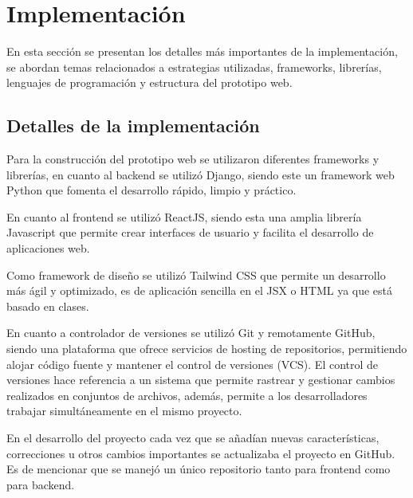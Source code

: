 \documentclass[../Main.tex]{subfiles}
\begin{document}
    \section{Implementación}
    \begin{justify}
    En esta sección se presentan los detalles más importantes de la implementación, se abordan temas relacionados a estrategias utilizadas, frameworks, librerías, lenguajes de programación y estructura del prototipo web.
    
    \end{justify}
    
    \subsection{Detalles de la implementación}
    \begin{justify}
    Para la construcción del prototipo web se utilizaron diferentes frameworks y librerías, en cuanto al backend se utilizó Django, siendo este un framework web Python que fomenta el desarrollo rápido, limpio y práctico. 
    \end{justify}
    En cuanto al frontend se utilizó ReactJS, siendo esta una amplia librería Javascript que permite crear interfaces de usuario y facilita el desarrollo de aplicaciones web.

    \begin{justify}
    Como framework de diseño se utilizó Tailwind CSS que permite un desarrollo más ágil y optimizado, es de aplicación sencilla en el JSX o HTML ya que está basado en clases.
    
    \end{justify}
    
    \begin{justify}
    En cuanto a controlador de versiones se utilizó Git y remotamente GitHub, siendo una plataforma que ofrece servicios de hosting de repositorios, permitiendo alojar código fuente y mantener el control de versiones (VCS). El control de versiones hace referencia a un sistema que permite rastrear y gestionar cambios realizados en conjuntos de archivos, además, permite a los desarrolladores trabajar simultáneamente en el mismo proyecto.
    
    En el desarrollo del proyecto cada vez que se añadían nuevas características, correcciones u otros cambios importantes se actualizaba el proyecto en GitHub. Es de mencionar que se manejó un único repositorio tanto para frontend como para backend.
    \end{justify}
    
\end{document}

